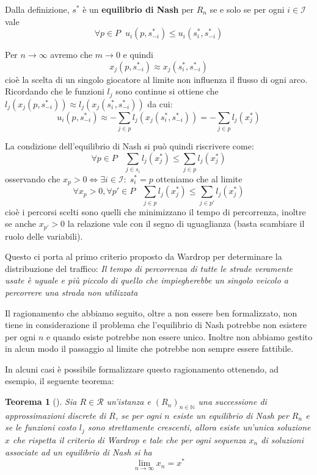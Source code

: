 \documentclass[a4paper]{article}
\newcounter{counter1}
\theoremstyle{plain}
\newtheorem{myteo}[counter1]{Teorema}
\theoremstyle{definition}
\theoremstyle{remark}
\newcommand{\pa}[1]{\left(#1\right)}
\begin{document}
Dalla definizione, $s^*$ è un \textbf{equilibrio di Nash} per $R_n$ se
e solo se per ogni $i\in \mathcal{I}$ vale
\[ \forall p\in P \;\; u_i \pa{p,s^*_{-i}} \le u_i\pa{s^*_i,s^*_{-i}} \]

Per $n \to \infty$ avremo che $m\to 0$ e quindi
\[ x_j\pa{p, s^*_{-i}} \approx x_j\pa{s^*_i, s^*_{-i}} \]
cioè la scelta di un singolo giocatore al limite non influenza il
flusso di ogni arco. Ricordando che le funzioni $l_j$ sono continue si
ottiene che
$l_j\pa{x_j\pa{p, s^*_{-i}}} \approx l_j\pa{x_j\pa{s^*_i, s^*_{-i}}}$
da cui:
\[ u_i\pa{p, s^*_{-i}} \approx - \sum_{j\in p} l_j\pa{x_j\pa{s^*_i,
      s^*_{-i}}} = -\sum _{j\in p}l_j\pa{x^*_j} \]

La condizione dell'equilibrio di Nash si può quindi riscrivere come:
\[ \forall p\in P\;\;\; \sum _{j\in s_i}l_j\pa{x^*_j} \le \sum _{j\in
    p}l_j\pa{x^*_j} \]
osservando che $x_p > 0 \Leftrightarrow \exists i\in \mathcal{I}:\;
s^*_i = p$ otteniamo che al limite
\[ \forall x_p >0, \forall p'\in P \;\;\; \sum _{j\in p}l_j\pa{x^*_j}
  \le \sum _{j\in p'}l_j\pa{x^*_j} \]
cioè i percorsi scelti sono quelli che minimizzano il tempo di
percorrenza, inoltre se anche $x_{p'} > 0$ la relazione vale con il
segno di uguaglianza (basta scambiare il ruolo delle variabili).

Questo ci porta al primo criterio proposto da
Wardrop\cite[pag. 345]{wardrop1952} per determinare la distribuzione
del traffico: \textit{Il tempo di percorrenza di tutte le strade
  veramente usate è uguale e più piccolo di quello che impiegherebbe
  un singolo veicolo a percorrere una strada non utilizzata}

Il ragionamento che abbiamo seguito, oltre a non essere ben
formalizzato, non tiene in considerazione il problema che l'equilibrio
di Nash potrebbe non esistere per ogni $n$ e quando esiste potrebbe
non essere unico. Inoltre non abbiamo gestito in alcun modo il
passaggio al limite che potrebbe non sempre essere fattibile.

In alcuni casi è possibile formalizzare questo ragionamento ottenendo,
ad esempio, il seguente teorema:
\begin{myteo}[{\cite[Teorema 3.2]{haurie1985}}]
  Sia $R\in \mathcal{R}$ un'istanza e $\pa{R_n}_{n\in \mathbb{N}}$ una
  successione di approssimazioni discrete di $R$, se per ogni $n$
  esiste un equilibrio di Nash per $R_n$ e se le funzioni costo $l_j$
  sono strettamente crescenti, allora esiste un'unica soluzione $x$
  che rispetta il criterio di Wardrop e tale che per ogni sequenza
  $x_n$ di soluzioni associate ad un equilibrio di Nash si ha
  \[ \lim _{n\to \infty} x_n = x^* \]
\end{myteo}
\end{document}
